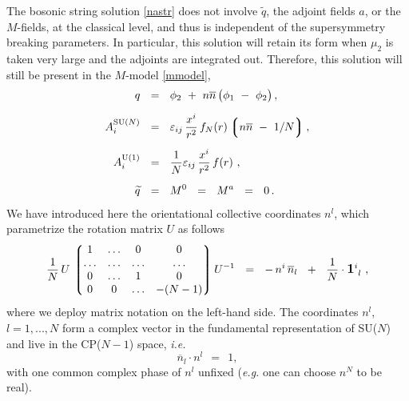 \documentclass[12pt]{article}
\def\beq{\begin{equation}}
\def\eeq{\end{equation}}
\newcommand{\wt}{\widetilde}
\newcommand{\ov}{\overline}
\newcommand{\lgr}{\left\lgroup}
\newcommand{\rgr}{\right\rgroup}
\newcommand{\nbar}{\ov{n}}
\begin{document}
	The bosonic string solution \eqref{nastr} does not involve $ \wt{q} $, the adjoint fields $ a $,
	or the $ M $-fields, at the classical level, and thus is independent of the supersymmetry
	breaking parameters.
	In particular, this solution will retain its form when $ \mu_2 $ is taken very large and the 
	adjoints are integrated out.
	Therefore, this solution will still be present in the $M$-model \eqref{mmodel}, 
\begin{align}
%
\notag
	q & ~~=~~ 
		\phi_2 ~+~ n\nbar\, \bigl( \phi_1 ~-~ \phi_2 \bigr) \,,
	\\[2mm]
%
\label{str}
	A_i^\text{SU($N$)} & ~~=~~ \varepsilon_{ij}\, \frac{x^i}{r^2}\, f_{N}(r)
				\lgr n\nbar ~-~ 1/N \rgr,
	\\[2mm]
%
\notag
	A_i^{\rm U(1)} & ~~=~~ \frac{1}{N}\varepsilon_{ij}\, \frac{x^i}{r^2}\, f(r)~, 
	\\[2mm]
%
\notag
	\wt{q} & ~~=~~ M^0 ~~=~~ M^a ~~=~~ 0\,.
\end{align}
	We have introduced here the orientational collective coordinates $ n^l $, which
	parametrize the rotation matrix $ U $ as follows
\beq
\label{n}
	\frac{1}{N}\, U \, \lgr \begin{matrix}
				  1  & \ldots & 0 & 0 \\
				  \ldots & \ldots & \ldots & \ldots \\
				  0 & \ldots & 1 & 0  \\
				  0 & 0 & \ldots & -(N-1) 
				\end{matrix} \rgr
			U^{-1}  
	~~=~~
	-\, n^i\,\ov{n}{}_l  ~~+~~ \frac{1}{N}\cdot{\mathlarger{\mathbf{1}}}{}^i_{~l} ~,
\eeq
	where we deploy matrix notation on the left-hand side.
	The coordinates $ n^l $, $ l = 1, ..., N $ form a complex vector in the fundamental representation
	of SU($N$) and live in the CP($N-1$) space, {\it i.e.}
\beq
\label{unitvec}
		\ov{n}{}_l \cdot n^l ~~=~~ 1,
\eeq
	with one common complex phase of $ n^l $ unfixed ({\it e.g.} one can choose $ n^N $ to be real).
\end{document}
